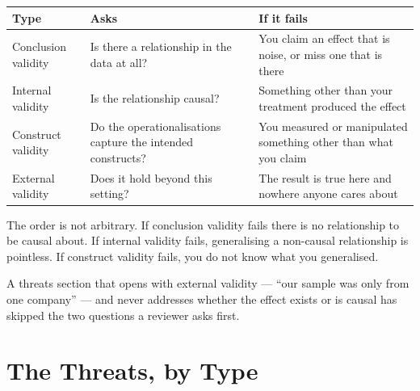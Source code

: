\begin{center}
\small
\begin{tabular}{@{}L{3.0cm}L{5.0cm}L{6.3cm}@{}}
\toprule
\textbf{Type} & \textbf{Asks} & \textbf{If it fails} \\
\midrule
Conclusion validity
  & Is there a relationship in the data at all?
  & You claim an effect that is noise, or miss one that is there \\
Internal validity
  & Is the relationship causal?
  & Something other than your treatment produced the effect \\
Construct validity
  & Do the operationalisations capture the intended constructs?
  & You measured or manipulated something other than what you claim \\
External validity
  & Does it hold beyond this setting?
  & The result is true here and nowhere anyone cares about \\
\bottomrule
\end{tabular}
\end{center}

\begin{conceptbox}
The order is not arbitrary. If conclusion validity fails there is no
relationship to be causal about. If internal validity fails, generalising a
non-causal relationship is pointless. If construct validity fails, you do not
know what you generalised.

\medskip
A threats section that opens with external validity --- ``our sample was only
from one company'' --- and never addresses whether the effect exists or is
causal has skipped the two questions a reviewer asks first.
\end{conceptbox}

\section{The Threats, by Type}

